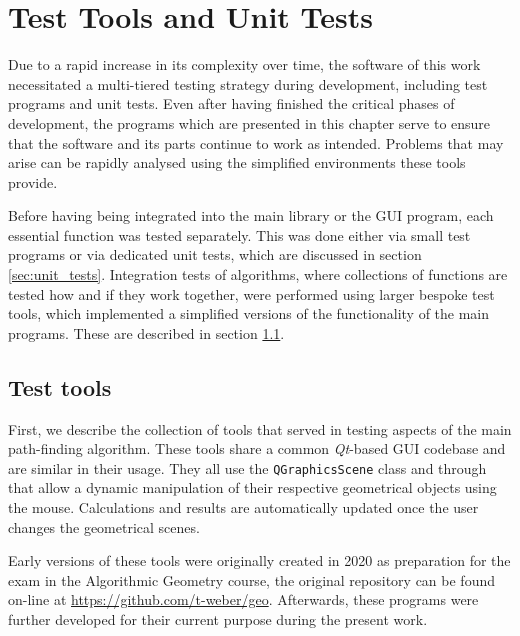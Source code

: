 %
%

\chapter{Test Tools and Unit Tests}
\label{ch:tests}
Due to a rapid increase in its complexity over time, the software of this work 
necessitated a multi-tiered testing strategy during development, including test programs and unit tests.
Even after having finished the critical phases of development, the programs which are 
presented in this chapter serve to ensure that the software and its parts continue to work as intended. 
Problems that may arise can be rapidly analysed using the simplified environments these tools provide.

Before having being integrated into the main library or the GUI program, each essential function was tested 
separately. This was done either via small test programs or via dedicated unit tests, which are discussed in 
section \ref{sec:unit_tests}.
Integration tests of algorithms, where collections of functions are tested how and if they work together, 
were performed using larger bespoke test tools, which implemented a simplified versions of the functionality 
of the main programs. These are described in section \ref{sec:tests_tools}.



\section{Test tools}
\label{sec:tests_tools}
First, we describe the collection of tools that served in testing aspects of the main path-finding algorithm.
These tools share a common \textit{Qt}-based \cite{web_Qt} GUI codebase and are similar in their usage.
They all use the \lstinline[language=C++]|QGraphicsScene| class \cite{web_QGraphicsScene} and through that
allow a dynamic manipulation of their respective geometrical objects using the mouse. 
Calculations and results are automatically updated once the user changes the geometrical scenes.

Early versions of these tools were originally created in 2020 as preparation for the exam in the Algorithmic
Geometry course, the original repository can be found on-line at \url{https://github.com/t-weber/geo}. 
Afterwards, these programs were further developed for their current purpose during the present work.



